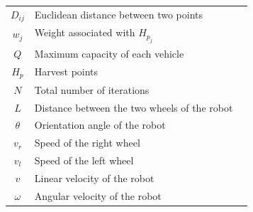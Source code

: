 \documentclass[conference]{IEEEtran}
\begin{document}
\begin{table}[t!]
\begin{tabularx}{\columnwidth}{@{}clX@{}}
        \textbf{$D_{ij}$} & Euclidean distance between two points \\
        \textbf{$w_{j}$} & Weight associated with $H_{p_{j}}$ \\
        \textbf{$Q$} & Maximum capacity of each vehicle \\
        \textbf{$H_{p}$} & Harvest points \\
        \textbf{$N$} & Total number of iterations \\
        \textbf{$L$} & Distance between the two wheels of the robot \\
        \textbf{$\theta$} & Orientation angle of the robot \\
        \textbf{$v_r$} & Speed of the right wheel \\
        \textbf{$v_l$} & Speed of the left wheel \\
        \textbf{$v$} & Linear velocity of the robot \\
        \textbf{$\omega$} & Angular velocity of the robot \\
        \bottomrule
    \end{tabularx}
\end{table}
\end{document}
